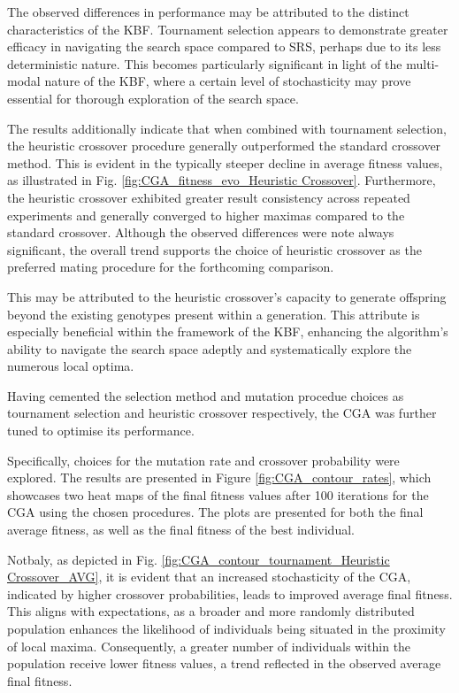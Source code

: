 \documentclass[10pt]{article}
\begin{document}
\begin{multicols}{2}
The observed differences in performance may be attributed to the distinct characteristics of the KBF. Tournament selection appears to demonstrate greater efficacy in navigating the search space compared to SRS, perhaps due to its less deterministic nature. This becomes particularly significant in light of the multi-modal nature of the KBF, where a certain level of stochasticity may prove essential for thorough exploration of the search space.

The results additionally indicate that when combined with tournament selection, the heuristic crossover procedure generally outperformed the standard crossover method. This is evident in the typically steeper decline in average fitness values, as illustrated in Fig. \ref{fig:CGA_fitness_evo_Heuristic Crossover}. Furthermore, the heuristic crossover exhibited greater result consistency across repeated experiments and generally converged to higher maximas compared to the standard crossover. Although the observed differences were note always significant, the overall trend supports the choice of heuristic crossover as the preferred mating procedure for the forthcoming comparison.

This may be attributed to the heuristic crossover's capacity to generate offspring beyond the existing genotypes present within a generation. This attribute is especially beneficial within the framework of the KBF, enhancing the algorithm's ability to navigate the search space adeptly and systematically explore the numerous local optima.

Having cemented the selection method and mutation procedue choices as tournament selection and heuristic crossover respectively, the CGA was further tuned to optimise its performance. 

Specifically, choices for the mutation rate and crossover probability were explored. The results are presented in Figure \ref{fig:CGA_contour_rates}, which showcases two heat maps of the final fitness values after 100 iterations for the CGA using the chosen procedures. The plots are presented for both the final average fitness, as well as the final fitness of the best individual.

Notbaly, as depicted in Fig. \ref{fig:CGA_contour_tournament_Heuristic Crossover_AVG}, it is evident that an increased stochasticity of the CGA, indicated by higher crossover probabilities, leads to improved average final fitness. This aligns with expectations, as a broader and more randomly distributed population enhances the likelihood of individuals being situated in the proximity of local maxima. Consequently, a greater number of individuals within the population receive lower fitness values, a trend reflected in the observed average final fitness.


\end{multicols}
\end{document}
